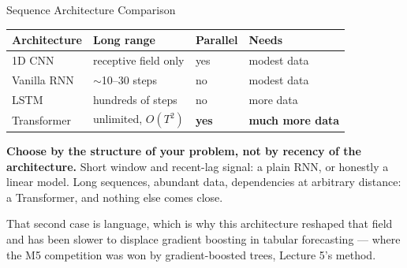 \documentclass[aspectratio=169, 11pt]{beamer}
\begin{document}

\begin{frame}{Sequence Architecture Comparison}
  \begin{center}
    {\small
    \begin{tabular}{llll}
      \toprule
      \textbf{Architecture} & \textbf{Long range} & \textbf{Parallel} & \textbf{Needs} \\
      \midrule
      1D CNN & receptive field only & yes & modest data \\
      Vanilla RNN & $\sim$10--30 steps & no & modest data \\
      LSTM & hundreds of steps & no & more data \\
      Transformer & unlimited, $O(T^2)$ & \textbf{yes} & \textbf{much more data} \\
      \bottomrule
    \end{tabular}
    }
  \end{center}

  \vspace{0.15cm}
  \textbf{Choose by the structure of your problem, not by recency of the architecture.} Short
  window and recent-lag signal: a plain RNN, or honestly a linear model. Long sequences, abundant
  data, dependencies at arbitrary distance: a Transformer, and nothing else comes close.

  \vspace{0.15cm}
  That second case is language, which is why this architecture reshaped that field and has been
  slower to displace gradient boosting in tabular forecasting --- where the M5 competition was won
  by gradient-boosted trees, Lecture 5's method.
\end{frame}
\end{document}
